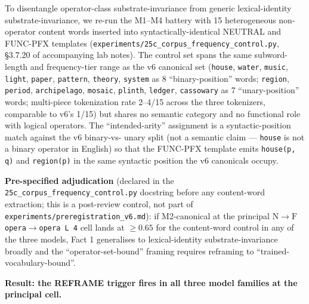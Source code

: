 \documentclass[11pt,letterpaper]{article}
\newcommand{\NtoF}{\ensuremath{\mathrm{N}\!\to\!\mathrm{F}}}
\newcommand{\Mc}{M2-canonical}
\begin{document}
To disentangle operator-class substrate-invariance from generic
lexical-identity substrate-invariance, we re-run the M1--M4 battery
with 15 heterogeneous non-operator content words inserted into
syntactically-identical NEUTRAL and FUNC-PFX templates
(\texttt{experiments/25c\_corpus\_frequency\_control.py}, \S3.7.20
of accompanying lab notes). The control set spans the same
subword-length and frequency-tier range as the v6 canonical set
(\texttt{house}, \texttt{water}, \texttt{music}, \texttt{light},
\texttt{paper}, \texttt{pattern}, \texttt{theory}, \texttt{system}
as 8 ``binary-position'' words; \texttt{region}, \texttt{period},
\texttt{archipelago}, \texttt{mosaic}, \texttt{plinth},
\texttt{ledger}, \texttt{cassowary} as 7 ``unary-position'' words;
multi-piece tokenization rate 2--4/15 across the three tokenizers,
comparable to v6's 1/15) but shares no semantic category and no
functional role with logical operators. The ``intended-arity''
assignment is a syntactic-position match against the v6 binary-vs-
unary split (not a semantic claim --- \texttt{house} is not a binary
operator in English) so that the FUNC-PFX template emits
\texttt{house(p, q)} and \texttt{region(p)} in the same syntactic
position the v6 canonicals occupy.

\textbf{Pre-specified adjudication} (declared in the
\texttt{25c\_corpus\_frequency\_control.py}
docstring before any content-word extraction; this is a post-review
control, not part of
\texttt{experiments/preregistration\_v6.md}): if \Mc{} at the
principal \texttt{\NtoF{} opera$\to$opera L\,4} cell lands at
$\geq 0.65$ for the content-word control in any of the three models,
Fact 1 generalises to lexical-identity substrate-invariance broadly
and the ``operator-set-bound'' framing requires reframing to
``trained-vocabulary-bound''.

\textbf{Result: the REFRAME trigger fires in all three model
families at the principal cell.}
\end{document}
